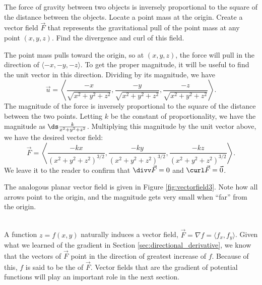 {The force of gravity between two objects is inversely proportional to the square of the distance between the objects. Locate a point mass at the origin. Create a vector field $\vec F$ that represents the gravitational pull of the point mass at any point $(x,y,z)$. Find the divergence and curl of this field. 
}
{The point mass pulls toward the origin, so at $(x,y,z)$, the force will pull in the direction of $\langle -x, -y, -z\rangle$. To get the proper magnitude, it will be useful to find the unit vector in this direction. Dividing by its magnitude, we have $$\vec u = \left\langle \frac{-x}{\sqrt{x^2+y^2+z^2}}, \frac{-y}{\sqrt{x^2+y^2+z^2}},\frac{-z}{\sqrt{x^2+y^2+z^2}}\right\rangle.$$
The magnitude of the force is inversely proportional to the square of the distance between the two points. Letting $k$ be the constant of proportionality, we have the magnitude as $\ds\frac{k}{x^2+y^2+z^2}$. Multiplying this magnitude by the unit vector above, we have the desired vector field:
$$\vec F = \left\langle \frac{-kx}{(x^2+y^2+z^2)^{3/2}}, \frac{-ky}{(x^2+y^2+z^2)^{3/2}},\frac{-kz}{(x^2+y^2+z^2)^{3/2}}\right\rangle.$$
We leave it to the reader to confirm that $\divv \vec F = 0$ and $\curl \vec F = \vec 0$.

The analogous planar vector field is given in Figure \ref{fig:vectorfield3}. Note how all arrows point to the origin, and the magnitude gets very small when ``far'' from the origin.
}\\

A function $z=f(x,y)$ naturally induces a vector field, $\vec F = \nabla f = \langle f_x,f_y\rangle$. Given what we learned of the gradient in Section \ref{sec:directional_derivative}, we know that the vectors of $\vec F$ point in the direction of greatest increase of $f$. Because of this, $f$ is said to be the  of $\vec F$. Vector fields that are the gradient of potential functions will play an important role in the next section.\\

